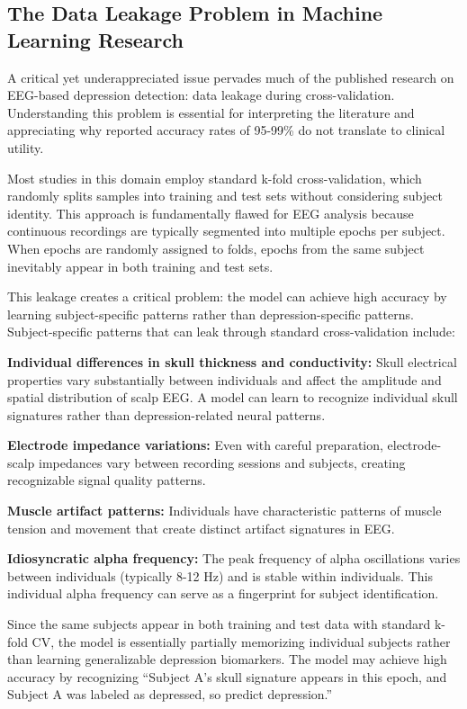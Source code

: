 \documentclass[blue,fullpaper]{ludusofficial}  %
\begin{document}
\subsection{The Data Leakage Problem in Machine Learning Research}

A critical yet underappreciated issue pervades much of the published research on EEG-based depression detection: data leakage during cross-validation. Understanding this problem is essential for interpreting the literature and appreciating why reported accuracy rates of 95-99\% do not translate to clinical utility.

Most studies in this domain employ standard k-fold cross-validation, which randomly splits samples into training and test sets without considering subject identity. This approach is fundamentally flawed for EEG analysis because continuous recordings are typically segmented into multiple epochs per subject. When epochs are randomly assigned to folds, epochs from the same subject inevitably appear in both training and test sets.

This leakage creates a critical problem: the model can achieve high accuracy by learning subject-specific patterns rather than depression-specific patterns. Subject-specific patterns that can leak through standard cross-validation include:

\textbf{Individual differences in skull thickness and conductivity:} Skull electrical properties vary substantially between individuals and affect the amplitude and spatial distribution of scalp EEG. A model can learn to recognize individual skull signatures rather than depression-related neural patterns.

\textbf{Electrode impedance variations:} Even with careful preparation, electrode-scalp impedances vary between recording sessions and subjects, creating recognizable signal quality patterns.

\textbf{Muscle artifact patterns:} Individuals have characteristic patterns of muscle tension and movement that create distinct artifact signatures in EEG.

\textbf{Idiosyncratic alpha frequency:} The peak frequency of alpha oscillations varies between individuals (typically 8-12 Hz) and is stable within individuals. This individual alpha frequency can serve as a fingerprint for subject identification.

Since the same subjects appear in both training and test data with standard k-fold CV, the model is essentially partially memorizing individual subjects rather than learning generalizable depression biomarkers. The model may achieve high accuracy by recognizing ``Subject A's skull signature appears in this epoch, and Subject A was labeled as depressed, so predict depression.''
\end{document}
